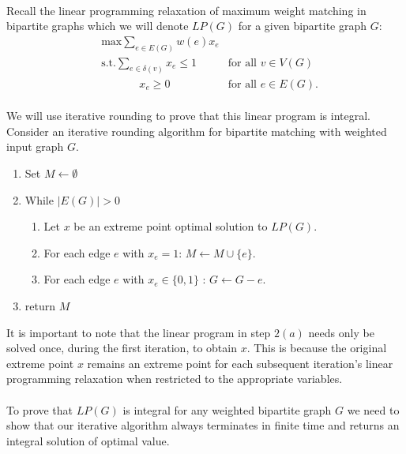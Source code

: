 \paragraph{}
Recall the linear programming relaxation of maximum weight matching in bipartite graphs which we will denote $LP(G)$ for a given bipartite graph $G$:
\begin{align*}
	&\text{max} \sum_{e \in E(G)} w(e) x_e \\
	&\text{s.t.} \sum_{e \in \delta(v)} x_e \leq 1 &\text{for all $v \in V(G)$} \\
	&\quad\quad\quad\ \ x_e \geq 0 &\text{for all $e \in E(G)$.}
\end{align*}
\paragraph{}
We will use iterative rounding to prove that this linear program is integral. Consider an iterative rounding algorithm for bipartite matching with weighted input graph $G$.
\begin{enumerate}
\item Set $M \leftarrow \emptyset$
\item While $|E(G)| > 0$\begin{enumerate}
\item Let $x$ be an extreme point optimal solution to $LP(G)$.
\item For each edge $e$ with $x_e = 1$: $M \leftarrow M \cup \{e\}$.
\item For each edge $e$ with $x_e \in \{0,1\}$ : $G \leftarrow G - e$.
\end{enumerate}
\item return $M$
\end{enumerate}
It is important to note that the linear program in step $2(a)$ needs only be solved once, during the first iteration, to obtain $x$. This is because the original extreme point $x$ remains an extreme point for each subsequent iteration's linear programming relaxation when restricted to the appropriate variables.
\paragraph{}
To prove that $LP(G)$ is integral for any weighted bipartite graph $G$ we need to show that our iterative algorithm always terminates in finite time and returns an integral solution of optimal value.
